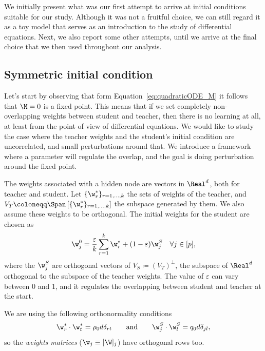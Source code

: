We initially present what was our first attempt to arrive at initial conditions suitable for our study.
Although it was not a fruitful choice,
we can still regard it as a toy model that serves as an introduction to the study of differential equations.
Next, we also report some other attempts, until we arrive at the final choice that we then used throughout our analysis.

\subsection{Symmetric initial condition} \label{subsec:symmetric_init}
Let's start by observing that form Equation~\eqref{eq:quadraticODE_M} it follows
that \(\M=0\) is a fixed point. This means that if we set completely non-overlapping
weights between student and teacher, then there is no learning at all, at least 
from the point of view of differential equations.
We would like to study the case where the teacher weights and the student's initial condition are uncorrelated,
and small perturbations around that. We introduce a framework where a parameter will
regulate the overlap, and the goal is doing perturbation around the fixed point.

The weights associated with a hidden node are vectors in \(\Real^d\), both for teacher and student.
Let \(\{\w^*_r\}_{r=1,\dots,k}\) the sets of weights of the teacher,
and \(V_T \coloneqq \Span\left[\{\w^*_r\}_{r=1,\dots,k}\right]\) the subspace generated by them.
We also assume these weights to be orthogonal. The initial weights for the student are chosen as
\[
    \w_j^0 = \frac{\varepsilon}{k} \sum_{r=1}^k \w^*_r + (1-\varepsilon) \w_j^S \quad
    \forall j\in [p],
\]
where the \(\w_j^S\) are orthogonal vectors of \(V_S \coloneqq (V_T)^\bot\),
the subspace of \(\Real^d\) orthogonal to the subspace of the teacher weights. 
The value of \(\varepsilon\) can vary between 0 and 1,
and it regulates the overlapping between student and teacher at the start.

We are using the following orthonormality conditions
\[
  \w^*_r \cdot \w^*_t = \rho_0d\delta_{rt}
  \qquad\text{and}\qquad
  \w_j^S\cdot\w_l^S=q_0d\delta_{jl},
\]
so the \emph{weights matrices} (\(\w_j \equiv [\W]_j\)) have orthogonal rows too.

